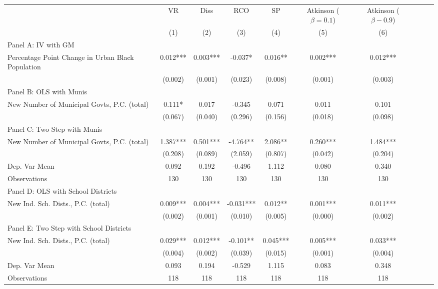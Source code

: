  \begin{tabular}{l*{9}{c}} \toprule
&\multicolumn{1}{c}{VR}&\multicolumn{1}{c}{Diss}&\multicolumn{1}{c}{RCO}&\multicolumn{1}{c}{SP}&\multicolumn{1}{c}{Atkinson ($\beta = 0.1$)}&\multicolumn{1}{c}{Atkinson ($\beta - 0.9$)}\\\cmidrule(lr){2-2}\cmidrule(lr){3-3}\cmidrule(lr){4-4}\cmidrule(lr){5-5}\cmidrule(lr){6-6}\cmidrule(lr){7-7}
&\multicolumn{1}{c}{(1)}&\multicolumn{1}{c}{(2)}&\multicolumn{1}{c}{(3)}&\multicolumn{1}{c}{(4)}&\multicolumn{1}{c}{(5)}&\multicolumn{1}{c}{(6)}\\
\cmidrule(lr){1-7}
\multicolumn{6}{l}{Panel A: IV with GM}\\
\cmidrule(lr){1-7}
Percentage Point Change in Urban Black Population&    0.012***&    0.003***&   -0.037*  &    0.016** &    0.002***&    0.012***\\
                &  (0.002)   &  (0.001)   &  (0.023)   &  (0.008)   &  (0.001)   &  (0.003)   \\
\cmidrule(lr){1-7}
\multicolumn{6}{l}{Panel B: OLS with Munis}\\
\cmidrule(lr){1-7}
New Number of Municipal Govts, P.C. (total)&    0.111*  &    0.017   &   -0.345   &    0.071   &    0.011   &    0.101   \\
                &  (0.067)   &  (0.040)   &  (0.296)   &  (0.156)   &  (0.018)   &  (0.098)   \\
\cmidrule(lr){1-7}
\multicolumn{6}{l}{Panel C: Two Step with Munis}\\
\cmidrule(lr){1-7}
New Number of Municipal Govts, P.C. (total)&    1.387***&    0.501***&   -4.764** &    2.086** &    0.260***&    1.484***\\
                &  (0.208)   &  (0.089)   &  (2.059)   &  (0.807)   &  (0.042)   &  (0.204)   \\
\midrule
Dep. Var Mean   &    0.092   &    0.192   &   -0.496   &    1.112   &    0.080   &    0.340   \\
Observations    &      130   &      130   &      130   &      130   &      130   &      130   \\
\cmidrule(lr){1-7}
\multicolumn{6}{l}{Panel D: OLS with School Districts}\\
\cmidrule(lr){1-7}
New Ind. Sch. Dists., P.C. (total)&    0.009***&    0.004***&   -0.031***&    0.012** &    0.001***&    0.011***\\
                &  (0.002)   &  (0.001)   &  (0.010)   &  (0.005)   &  (0.000)   &  (0.002)   \\
\cmidrule(lr){1-7}
\multicolumn{6}{l}{Panel E: Two Step with School Districts}\\
\cmidrule(lr){1-7}
New Ind. Sch. Dists., P.C. (total)&    0.029***&    0.012***&   -0.101** &    0.045***&    0.005***&    0.033***\\
                &  (0.004)   &  (0.002)   &  (0.039)   &  (0.015)   &  (0.001)   &  (0.004)   \\
\midrule
Dep. Var Mean   &    0.093   &    0.194   &   -0.529   &    1.115   &    0.083   &    0.348   \\
Observations    &      118   &      118   &      118   &      118   &      118   &      118   \\
       \bottomrule \end{tabular}
